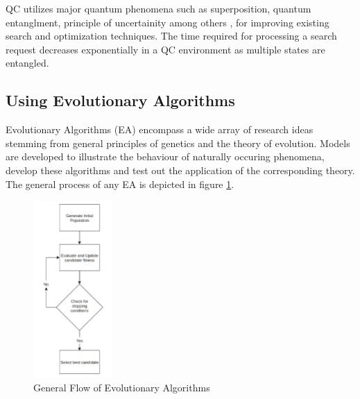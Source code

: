 \documentclass[conference]{IEEEtran}
\begin{document}
QC utilizes major quantum phenomena such as superposition, quantum entanglment, principle of uncertainity among others \cite{az}, for improving existing search and optimization techniques. The time required for processing a search request decreases exponentially in a QC environment as multiple states are entangled.  

\subsection{Using Evolutionary Algorithms}

Evolutionary Algorithms (EA) \cite{vik} encompass a wide array of research ideas stemming from general principles of genetics and the theory of evolution. Models are developed to illustrate the behaviour of naturally occuring phenomena, develop these algorithms and test out the application of the corresponding theory. The general process of any EA is depicted in figure \ref{p1}. 

\begin{figure}[!t]
\centering\includegraphics[height=6.75cm]{p1.png}
\caption{General Flow of Evolutionary Algorithms}
\label{p1}
\end{figure}
\end{document}
